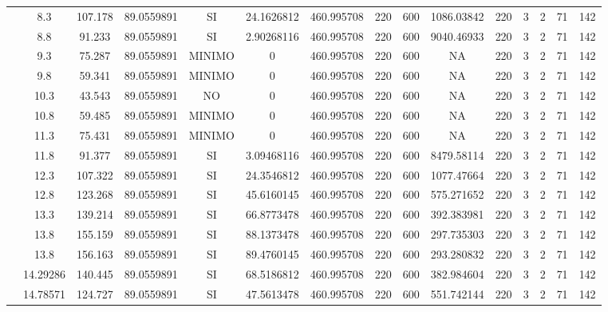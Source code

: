 \begin{table}[H]
{\begin{tabular}{|c|c|c|c|c|c|c|c|c|c|c|c|c|c|c|}
\cline{2-15}    & 8.3 & 107.178 & 89.0559891 & SI  & 24.1626812 & 460.995708 & 220 & 600 & 1086.03842 & 220 & 3   & 2   & 71  & 142 \bigstrut\\
\cline{2-15}    & 8.8 & 91.233 & 89.0559891 & SI  & 2.90268116 & 460.995708 & 220 & 600 & 9040.46933 & 220 & 3   & 2   & 71  & 142 \bigstrut\\
\cline{2-15}    & 9.3 & 75.287 & 89.0559891 & MINIMO & 0   & 460.995708 & 220 & 600 & NA  & 220 & 3   & 2   & 71  & 142 \bigstrut\\
\cline{2-15}    & 9.8 & 59.341 & 89.0559891 & MINIMO & 0   & 460.995708 & 220 & 600 & NA  & 220 & 3   & 2   & 71  & 142 \bigstrut\\
\cline{2-15}    & 10.3 & 43.543 & 89.0559891 & NO  & 0   & 460.995708 & 220 & 600 & NA  & 220 & 3   & 2   & 71  & 142 \bigstrut\\
\cline{2-15}    & 10.8 & 59.485 & 89.0559891 & MINIMO & 0   & 460.995708 & 220 & 600 & NA  & 220 & 3   & 2   & 71  & 142 \bigstrut\\
\cline{2-15}    & 11.3 & 75.431 & 89.0559891 & MINIMO & 0   & 460.995708 & 220 & 600 & NA  & 220 & 3   & 2   & 71  & 142 \bigstrut\\
\cline{2-15}    & 11.8 & 91.377 & 89.0559891 & SI  & 3.09468116 & 460.995708 & 220 & 600 & 8479.58114 & 220 & 3   & 2   & 71  & 142 \bigstrut\\
\cline{2-15}    & 12.3 & 107.322 & 89.0559891 & SI  & 24.3546812 & 460.995708 & 220 & 600 & 1077.47664 & 220 & 3   & 2   & 71  & 142 \bigstrut\\
\cline{2-15}    & 12.8 & 123.268 & 89.0559891 & SI  & 45.6160145 & 460.995708 & 220 & 600 & 575.271652 & 220 & 3   & 2   & 71  & 142 \bigstrut\\
\cline{2-15}    & 13.3 & 139.214 & 89.0559891 & SI  & 66.8773478 & 460.995708 & 220 & 600 & 392.383981 & 220 & 3   & 2   & 71  & 142 \bigstrut\\
\cline{2-15}    & 13.8 & 155.159 & 89.0559891 & SI  & 88.1373478 & 460.995708 & 220 & 600 & 297.735303 & 220 & 3   & 2   & 71  & 142 \bigstrut\\
\cline{2-15}    & 13.8 & 156.163 & 89.0559891 & SI  & 89.4760145 & 460.995708 & 220 & 600 & 293.280832 & 220 & 3   & 2   & 71  & 142 \bigstrut\\
\cline{2-15}    & 14.29286 & 140.445 & 89.0559891 & SI  & 68.5186812 & 460.995708 & 220 & 600 & 382.984604 & 220 & 3   & 2   & 71  & 142 \bigstrut\\
\cline{2-15}    & 14.78571 & 124.727 & 89.0559891 & SI  & 47.5613478 & 460.995708 & 220 & 600 & 551.742144 & 220 & 3   & 2   & 71  & 142 \bigstrut\\

\end{tabular}}
\end{table}
